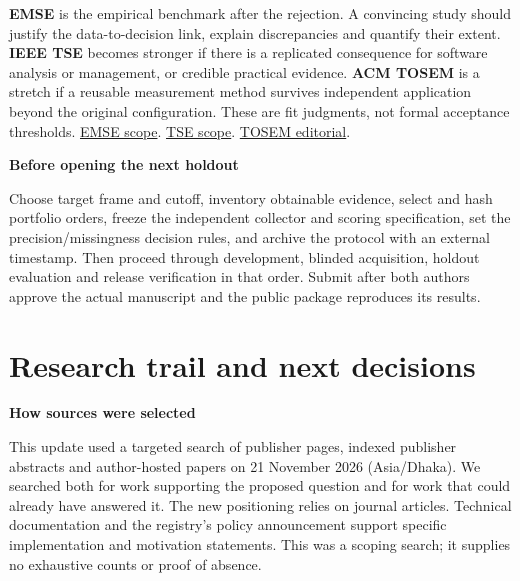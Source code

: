 \documentclass[11pt,a4paper]{article}
\newcommand{\pg}[1]{\newpage\section{\color{ink}#1}}
\newcommand{\hd}[1]{\par\textbf{\color{accent}#1}\par\nopagebreak}
\begin{document}
\textbf{EMSE} is the empirical benchmark after the rejection. A convincing study should justify the data-to-decision link, explain discrepancies and quantify their extent. \textbf{IEEE TSE} becomes stronger if there is a replicated consequence for software analysis or management, or credible practical evidence. \textbf{ACM TOSEM} is a stretch if a reusable measurement method survives independent application beyond the original configuration. These are fit judgments, not formal acceptance thresholds. \href{https://link.springer.com/journal/10664/aims-and-scope}{EMSE scope}. \href{https://www.computer.org/digital-library/journals/ts/cfp-ieee-transactions-on-software-engineering}{TSE scope}. \href{https://abhikrc.com/pdf/TOSEMeditorial2025.pdf}{TOSEM editorial}.

\hd{Before opening the next holdout}
Choose target frame and cutoff, inventory obtainable evidence, select and hash portfolio orders, freeze the independent collector and scoring specification, set the precision/missingness decision rules, and archive the protocol with an external timestamp. Then proceed through development, blinded acquisition, holdout evaluation and release verification in that order. Submit after both authors approve the actual manuscript and the public package reproduces its results.
\pg{Research trail and next decisions}
\hd{How sources were selected}
This update used a targeted search of publisher pages, indexed publisher abstracts and author-hosted papers on 21 November 2026 (Asia/Dhaka). We searched both for work supporting the proposed question and for work that could already have answered it. The new positioning relies on journal articles. Technical documentation and the registry's policy announcement support specific implementation and motivation statements. This was a scoping search; it supplies no exhaustive counts or proof of absence.
\end{document}

